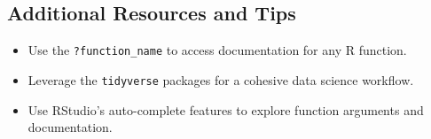 \subsection{Additional Resources and Tips}
\begin{itemize}
    \item Use the \texttt{?function\_name} to access documentation for any R function.
    \item Leverage the \texttt{tidyverse} packages for a cohesive data science workflow.
    \item Use RStudio’s auto-complete features to explore function arguments and documentation.
\end{itemize}
